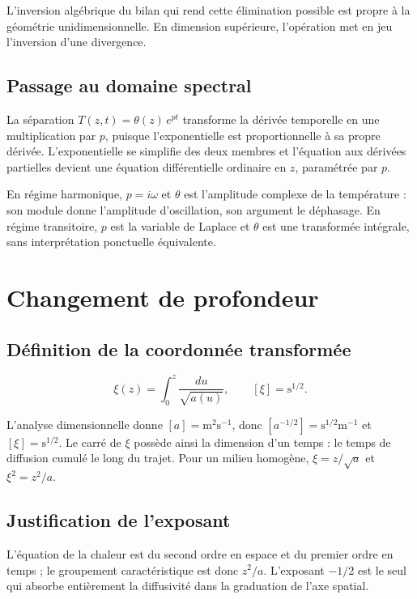 \documentclass[11pt,a4paper]{article}
\begin{document}
L'inversion algébrique du bilan qui rend cette élimination possible est propre à la géométrie
unidimensionnelle. En dimension supérieure, l'opération met en jeu l'inversion d'une divergence.

\subsection{Passage au domaine spectral}

La séparation $T(z,t) = \theta(z)\,e^{pt}$ transforme la dérivée temporelle en une multiplication par
$p$, puisque l'exponentielle est proportionnelle à sa propre dérivée. L'exponentielle se simplifie des
deux membres et l'équation aux dérivées partielles devient une équation différentielle ordinaire en
$z$, paramétrée par $p$.

En régime harmonique, $p = i\omega$ et $\theta$ est l'amplitude complexe de la température : son module
donne l'amplitude d'oscillation, son argument le déphasage. En régime transitoire, $p$ est la variable
de Laplace et $\theta$ est une transformée intégrale, sans interprétation ponctuelle équivalente.

\section{Changement de profondeur}

\subsection{Définition de la coordonnée transformée}

\[ \xi(z) = \int_{0}^{z} \frac{du}{\sqrt{a(u)}} , \qquad [\xi] = \mathrm{s^{1/2}} . \]

L'analyse dimensionnelle donne $[a] = \mathrm{m^{2}s^{-1}}$, donc $[a^{-1/2}] = \mathrm{s^{1/2}m^{-1}}$
et $[\xi] = \mathrm{s^{1/2}}$. Le carré de $\xi$ possède ainsi la dimension d'un temps : le temps de
diffusion cumulé le long du trajet. Pour un milieu homogène, $\xi = z/\sqrt{a}$ et $\xi^{2} = z^{2}/a$.

\subsection{Justification de l'exposant}

L'équation de la chaleur est du second ordre en espace et du premier ordre en temps ; le groupement
caractéristique est donc $z^{2}/a$. L'exposant $-1/2$ est le seul qui absorbe entièrement la
diffusivité dans la graduation de l'axe spatial.
\end{document}
